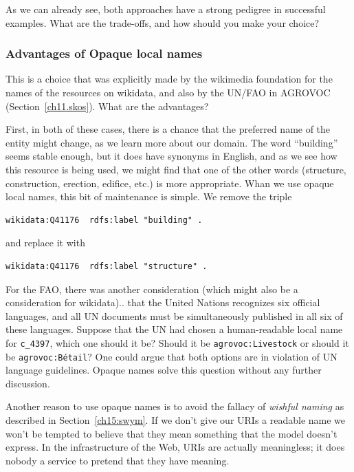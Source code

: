 As we can already see, both approaches have a strong pedigree in successful examples.  
What are the trade-offs, and how should you make your choice? 

\subsubsection{Advantages of Opaque local names}
This is a choice that was explicitly made by the wikimedia foundation for the names of the 
resources on wikidata, and also by the UN/FAO in AGROVOC (Section~\ref{ch11.skos}).  What
are the advantages? 

First, in both of these cases, there is a chance that the preferred name of the
entity might change, as we learn more about our domain.  The word ``building'' seems 
stable enough, but it does have synonyms in English, and as we see how this resource is
being used, we might find that one of the other words (structure, construction, 
erection, edifice, etc.) 
is more appropriate.  Whan we use opaque local names, this bit of maintenance is simple.  We remove the triple

\begin{lstlisting}
wikidata:Q41176  rdfs:label "building" .
\end{lstlisting}

and replace it with


\begin{lstlisting}
wikidata:Q41176  rdfs:label "structure" .
\end{lstlisting}

For the FAO, there was another consideration (which might also be a consideration 
for wikidata).. 
that the United Nations recognizes six official languages, and all 
UN documents must be simultaneously published in all six of these languages. 
Suppose that the UN had chosen a human-readable local name for \texttt{c\_4397}, which one
should it be?  Should it be \texttt{agrovoc:Livestock} or should it be 
\texttt{agrovoc:B\'etail}?  One could argue that both options are in violation of 
UN language guidelines.  Opaque names solve this question without any further 
discussion. 

Another reason to use opaque names is to avoid the fallacy of \emph{wishful naming} 
as described in Section~\ref{ch15:swym}.  If we don't give our URIs a readable name
we won't be tempted to believe that they mean something that the model doesn't 
express.  In the infrastructure of the Web, URIs are actually meaningless; it does
nobody a service to pretend that they have meaning. 

